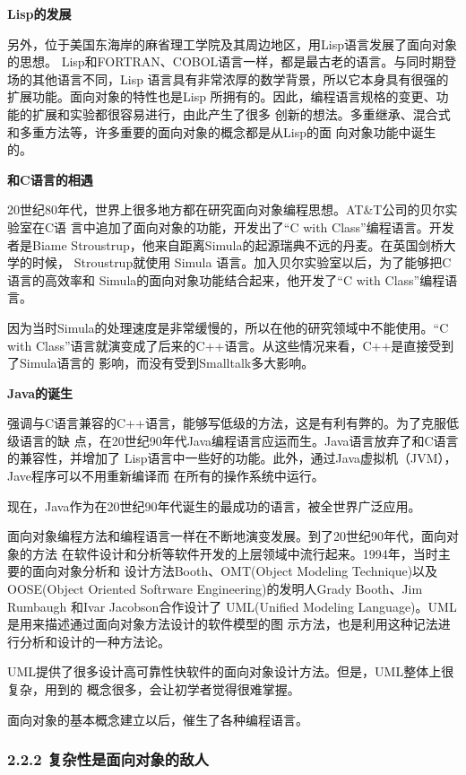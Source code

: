 \documentclass[11pt]{ctexart}
\begin{document}
\textbf{Lisp的发展}

另外，位于美国东海岸的麻省理工学院及其周边地区，用Lisp语言发展了面向对象的思想。
Lisp和FORTRAN、COBOL语言一样，都是最古老的语言。与同时期登场的其他语言不同，Lisp
语言具有非常浓厚的数学背景，所以它本身具有很强的扩展功能。面向对象的特性也是Lisp
所拥有的。因此，编程语言规格的变更、功能的扩展和实验都很容易进行，由此产生了很多
创新的想法。多重继承、混合式和多重方法等，许多重要的面向对象的概念都是从Lisp的面
向对象功能中诞生的。


\textbf{和C语言的相遇}

20世纪80年代，世界上很多地方都在研究面向对象编程思想。AT\&T公司的贝尔实验室在C语
言中追加了面向对象的功能，开发出了“C with Class”编程语言。开发者是Biame
Stroustrup，他来自距离Simula的起源瑞典不远的丹麦。在英国剑桥大学的时候，
Stroustrup就使用 Simula 语言。加入贝尔实验室以后，为了能够把C语言的高效率和
Simula的面向对象功能结合起来，他开发了“C with Class”编程语言。

因为当时Simula的处理速度是非常缓慢的，所以在他的研究领域中不能使用。“C with
Class”语言就演变成了后来的C++语言。从这些情况来看，C++是直接受到了Simula语言的
影响，而没有受到Smalltalk多大影响。

\textbf{Java的诞生}

强调与C语言兼容的C++语言，能够写低级的方法，这是有利有弊的。为了克服低级语言的缺
点，在20世纪90年代Java编程语言应运而生。Java语言放弃了和C语言的兼容性，并增加了
Lisp语言中一些好的功能。此外，通过Java虚拟机（JVM），Jave程序可以不用重新编译而
在所有的操作系统中运行。

现在，Java作为在20世纪90年代诞生的最成功的语言，被全世界广泛应用。

面向对象编程方法和编程语言一样在不断地演变发展。到了20世纪90年代，面向对象的方法
在软件设计和分析等软件开发的上层领域中流行起来。1994年，当时主要的面向对象分析和
设计方法Booth、OMT(Object Modeling Technique)以及OOSE(Object Oriented Softrware
Engineering)的发明人Grady Booth、Jim Rumbaugh 和Ivar Jacobson合作设计了
UML(Unified Modeling Language)。UML是用来描述通过面向对象方法设计的软件模型的图
示方法，也是利用这种记法进行分析和设计的一种方法论。

UML提供了很多设计高可靠性快软件的面向对象设计方法。但是，UML整体上很复杂，用到的
概念很多，会让初学者觉得很难掌握。

面向对象的基本概念建立以后，催生了各种编程语言。
\subsubsection{2.2.2 复杂性是面向对象的敌人}
\label{sec:org4235490}
\end{document}

